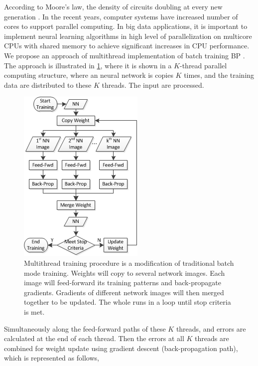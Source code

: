 \documentclass[procedia]{easychair}
\begin{document}
According to Moore’s law, the density of circuits doubling at every new generation \cite{chu2007map}.  In the recent years, computer systems have increased number of cores to support parallel computing.  In big data applications, it is important to implement neural learning algorithms in high level of parallelization on multicore CPUs with shared memory to achieve significant increases in CPU performance.  We propose an approach of multithread implementation of batch training BP \cite{schuessler2011parallel}.  The approach is illustrated in \ref{fig:parallelization}, where it is shown in a $K$-thread parallel computing structure, where an neural network is copies $K$ times, and the training data are distributed to these $K$ threads.  The input are processed.

\begin{figure}[tb]
    \begin{centering}
        \includegraphics[scale=1]{../../pic/parallelization.png}
        \caption{Multithread training procedure is a modification of traditional batch mode training.  Weights will copy to several network images.  Each image will feed-forward its training patterns and back-propagate gradients.  Gradients of different network images will then merged together to be updated.  The whole runs in a loop until stop criteria is met.}
    \label{fig:parallelization}
	\end{centering}
\end{figure}

Simultaneously along the feed-forward paths of these $K$ threads, and errors are calculated at the end of each thread.  Then the errors at all $K$ threads are combined for weight update using gradient descent (back-propagation path), which is represented as follows,
\end{document}
